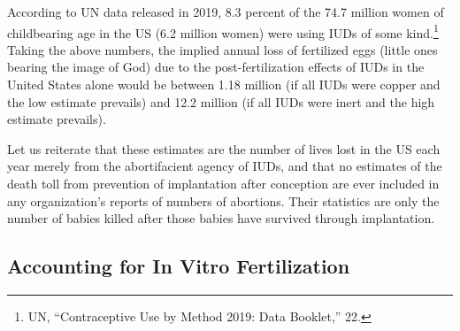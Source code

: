 \documentclass[
]{book}
\begin{document}
According to UN data released in 2019, 8.3 percent of the 74.7 million women of childbearing age in the US (6.2 million women) were using IUDs of some kind.\footnote{UN, ``Contraceptive Use by Method 2019: Data Booklet,'' 22.} Taking the above numbers, the implied annual loss of fertilized eggs (little ones bearing the image of God) due to the post-fertilization effects of IUDs in the United States alone would be between 1.18 million (if all IUDs were copper and the low estimate prevails) and 12.2 million (if all IUDs were inert and the high estimate prevails).

Let us reiterate that these estimates are the number of lives lost in the US each year merely from the abortifacient agency of IUDs, and that no estimates of the death toll from prevention of implantation after conception are ever included in any organization's reports of numbers of abortions. Their statistics are only the number of babies killed after those babies have survived through implantation.

\hypertarget{accounting-for-in-vitro-fertilization}{%
\subsection{Accounting for In Vitro Fertilization}\label{accounting-for-in-vitro-fertilization}}
\end{document}
